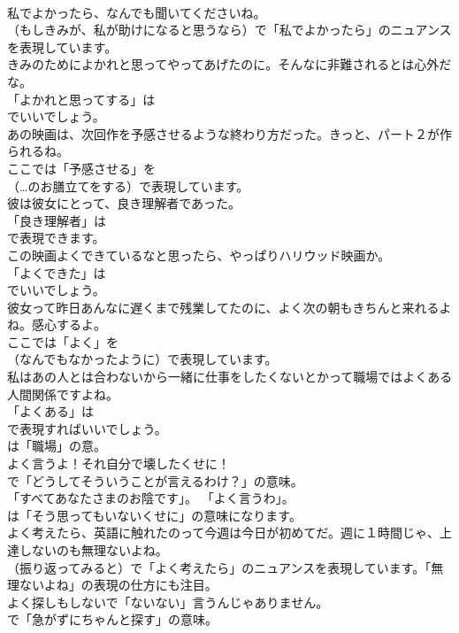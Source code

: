 \documentclass[8pt]{extreport}
\begin{document}
\begin{CJK}{UTF8}{min}
\\	私でよかったら、なんでも聞いてくださいね。 
\\	（もしきみが、私が助けになると思うなら）で「私でよかったら」のニュアンスを表現しています。	
\\	きみのためによかれと思ってやってあげたのに。そんなに非難されるとは心外だな。 
\\	「よかれと思ってする」は
\\	でいいでしょう。	
\\	あの映画は、次回作を予感させるような終わり方だった。きっと、パート２が作られるね。 
\\	ここでは「予感させる」を 
\\	（…のお膳立てをする）で表現しています。	
\\	彼は彼女にとって、良き理解者であった。 
\\	「良き理解者」は
\\	で表現できます。	
\\	この映画よくできているなと思ったら、やっぱりハリウッド映画か。 
\\	「よくできた」は
\\	でいいでしょう。	
\\	彼女って昨日あんなに遅くまで残業してたのに、よく次の朝もきちんと来れるよね。感心するよ。 
\\	ここでは「よく」を
\\	（なんでもなかったように）で表現しています。	
\\	私はあの人とは合わないから一緒に仕事をしたくないとかって職場ではよくある人間関係ですよね。 
\\	「よくある」は 
\\	で表現すればいいでしょう。
\\	は「職場」の意。	
\\	よく言うよ！それ自分で壊したくせに！ 
\\	で「どうしてそういうことが言えるわけ？」の意味。	
\\	「すべてあなたさまのお陰です」。 「よく言うわ」。 
\\	は「そう思ってもいないくせに」の意味になります。	
\\	よく考えたら、英語に触れたのって今週は今日が初めてだ。週に１時間じゃ、上達しないのも無理ないよね。 
\\	（振り返ってみると）で「よく考えたら」のニュアンスを表現しています。「無理ないよね」の表現の仕方にも注目。	
\\	よく探しもしないで「ないない」言うんじゃありません。 
\\	で「急がずにちゃんと探す」の意味。

\end{CJK}
\end{document}
